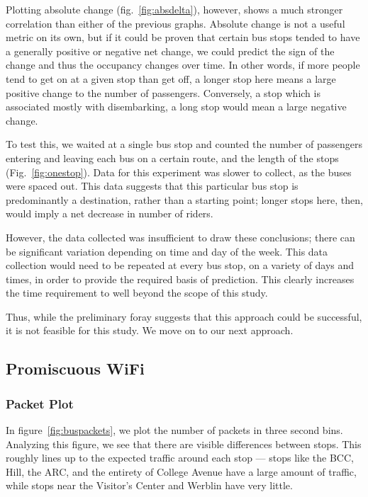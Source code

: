 Plotting absolute change (fig.~\ref{fig:absdelta}), however, shows a much stronger correlation than either of the previous graphs.
Absolute change is not a useful metric on its own, but if it could be proven that certain bus stops tended to have a generally positive or negative net change, we could predict the sign of the change and thus the occupancy changes over time.
In other words, if more people tend to get on at a given stop than get off, a longer stop here means a large positive change to the number of passengers.
Conversely, a stop which is associated mostly with disembarking, a long stop would mean a large negative change.

To test this, we waited at a single bus stop and counted the number of passengers entering and leaving each bus on a certain route, and the length of the stops (Fig.~\ref{fig:onestop}).
Data for this experiment was slower to collect, as the buses were spaced out.
This data suggests that this particular bus stop is predominantly a destination, rather than a starting point; longer stops here, then, would imply a net decrease in number of riders.

However, the data collected was insufficient to draw these conclusions; there can be significant variation depending on time and day of the week.
This data collection would need to be repeated at every bus stop, on a variety of days and times, in order to provide the required basis of prediction.
This clearly increases the time requirement to well beyond the scope of this study.

Thus, while the preliminary foray suggests that this approach could be successful, it is not feasible for this study.
We move on to our next approach.

\subsection{Promiscuous WiFi}

\subsubsection*{Packet Plot}

In figure~\ref{fig:buspackets}, we plot the number of packets in three second bins.
Analyzing this figure, we see that there are visible differences between stops.
This roughly lines up to the expected traffic around each stop --- stops like the BCC, Hill, the ARC, and the entirety of College Avenue have a large amount of traffic, while stops near the Visitor's Center and Werblin have very little.

